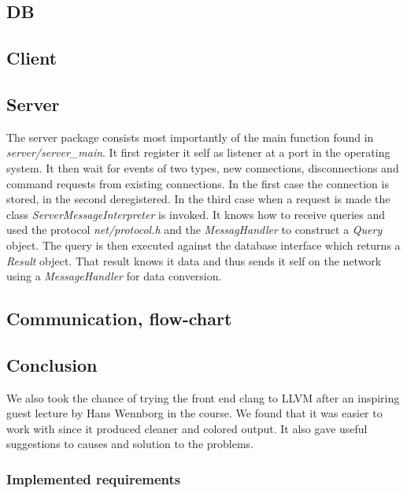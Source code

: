 \documentclass[10pt, a4paper]{article}
\begin{document}
\subsection{DB}
\subsection{Client}
\subsection{Server}
The server package consists most importantly of the main function found in \emph{server/server\_main}. It first register it self as listener at a port in the operating system. It then wait for events of two types, new connections, disconnections and command requests from existing connections. In the first case the connection is stored, in the second deregistered. In the third case when a request is made the class \emph{ServerMessageInterpreter} is invoked. It knows how to receive queries and used the protocol \emph{net/protocol.h} and the \emph{MessagHandler} to construct a \emph{Query} object. The query is then executed against the database interface which returns a \emph{Result} object. That result knows it data and thus sends it self on the network using a \emph{MessageHandler} for data conversion.

\subsection{Communication, flow-chart}

\subsection{Conclusion}


We also took the chance of trying the front end clang to LLVM after an inspiring guest lecture by Hans Wennborg in the course. We found that it was easier to work with since it produced cleaner and colored output. It also gave useful suggestions to causes and solution to the problems.

\subsubsection{Implemented requirements}
\end{document}
